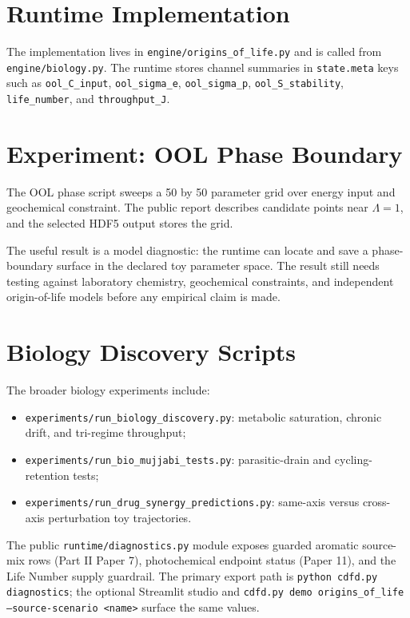 \documentclass[12pt,a4paper]{article}
\begin{document}
\section{Runtime Implementation}
The implementation lives in \texttt{engine/origins\_of\_life.py} and is called
from \texttt{engine/biology.py}. The runtime stores channel summaries in
\texttt{state.meta} keys such as \texttt{ool\_C\_input},
\texttt{ool\_sigma\_e}, \texttt{ool\_sigma\_p},
\texttt{ool\_S\_stability}, \texttt{life\_number}, and
\texttt{throughput\_J}.

\section{Experiment: OOL Phase Boundary}
The OOL phase script sweeps a 50 by 50 parameter grid over energy input and
geochemical constraint. The public report describes candidate points near
$\Lambda=1$, and the selected HDF5 output stores the grid.

The useful result is a model diagnostic: the runtime can locate and save a
phase-boundary surface in the declared toy parameter space. The result still needs testing against laboratory chemistry, geochemical constraints, and independent
origin-of-life models before any empirical claim is made.

\section{Biology Discovery Scripts}
The broader biology experiments include:
\begin{itemize}
    \item \texttt{experiments/run\_biology\_discovery.py}: metabolic saturation,
    chronic drift, and tri-regime throughput;
    \item \texttt{experiments/run\_bio\_mujjabi\_tests.py}: parasitic-drain and
    cycling-retention tests;
    \item \texttt{experiments/run\_drug\_synergy\_predictions.py}: same-axis
    versus cross-axis perturbation toy trajectories.
\end{itemize}
The public \texttt{runtime/diagnostics.py} module exposes guarded aromatic
source-mix rows (Part II Paper 7), photochemical endpoint status (Paper 11),
and the Life Number supply guardrail. The primary export path is
\texttt{python cdfd.py diagnostics}; the optional Streamlit studio and
\texttt{cdfd.py demo origins\_of\_life --source-scenario <name>} surface the
same values.
\end{document}

